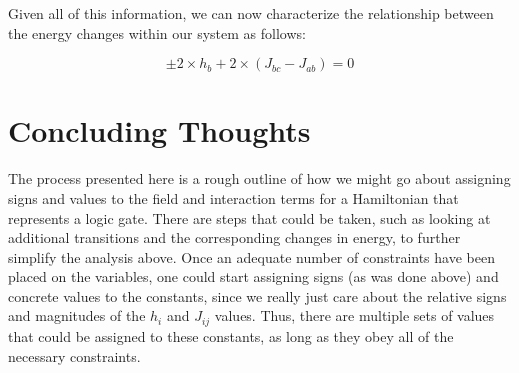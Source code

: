 \documentclass[]{article}
\begin{document}
Given all of this information, we can now characterize the relationship
between the energy changes within our system as follows:

\[\pm 2 \times h_b + 2 \times (J_{bc} - J_{ab}) = 0\]

\section{Concluding Thoughts}\label{concluding-thoughts}

The process presented here is a rough outline of how we might go about
assigning signs and values to the field and interaction terms for a
Hamiltonian that represents a logic gate. There are steps that could be
taken, such as looking at additional transitions and the corresponding
changes in energy, to further simplify the analysis above. Once an
adequate number of constraints have been placed on the variables, one
could start assigning signs (as was done above) and concrete values to
the constants, since we really just care about the relative signs and
magnitudes of the \(h_i\) and \(J_{ij}\) values. Thus, there are
multiple sets of values that could be assigned to these constants, as
long as they obey all of the necessary constraints.
\end{document}

